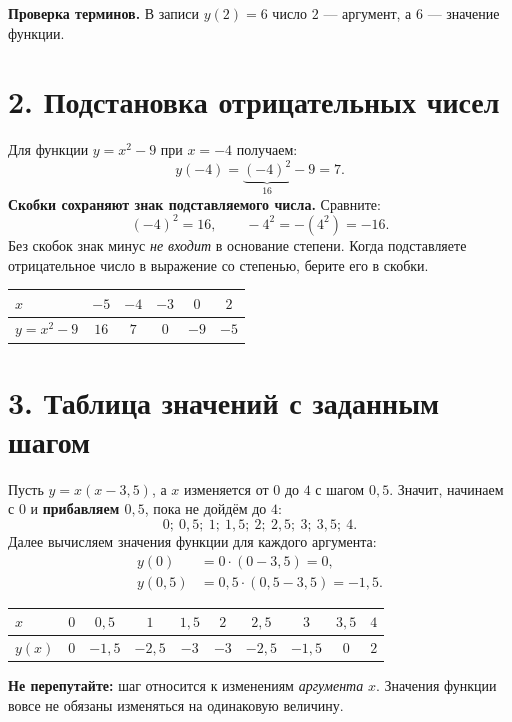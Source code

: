 \documentclass[a4paper,12pt]{article}
\newcommand{\key}[1]{\textbf{\color{darkaccent}#1}}
\newcommand{\sectionrule}{\vspace{-0.55em}{\color{accent}\hrule height .6pt}\vspace{0.5em}}
\begin{document}
\key{Проверка терминов.} В записи $y(2)=6$ число $2$ --- аргумент, а $6$ --- значение функции.

\section*{2. Подстановка отрицательных чисел}
\sectionrule
Для функции $y=x^2-9$ при $x=-4$ получаем:
\[
y(-4)=\underbrace{(-4)^2}_{16}-9=7.
\]
\key{Скобки сохраняют знак подставляемого числа.} Сравните:
\[
(-4)^2=16,\qquad -4^2=-(4^2)=-16.
\]
Без скобок знак минус \emph{не входит} в основание степени. Когда подставляете отрицательное число в выражение со степенью, берите его в скобки.

\begin{center}
\renewcommand{\arraystretch}{1.3}
\begin{tabularx}{.84\linewidth}{@{}l*{5}{C}@{}}
\toprule
$x$ & $-5$ & $-4$ & $-3$ & $0$ & $2$\\
\midrule
$y=x^2-9$ & $16$ & $7$ & $0$ & $-9$ & $-5$\\
\bottomrule
\end{tabularx}
\end{center}

\section*{3. Таблица значений с заданным шагом}
\sectionrule
Пусть $y=x(x-3{,}5)$, а $x$ изменяется от $0$ до $4$ с шагом $0{,}5$. Значит, начинаем с $0$ и \key{прибавляем $0{,}5$}, пока не дойдём до $4$:
\[
0;\ 0{,}5;\ 1;\ 1{,}5;\ 2;\ 2{,}5;\ 3;\ 3{,}5;\ 4.
\]
Далее вычисляем значения функции для каждого аргумента:
\[
\begin{aligned}
y(0)&=0\cdot(0-3{,}5)=0,\\
y(0{,}5)&=0{,}5\cdot(0{,}5-3{,}5)=-1{,}5.
\end{aligned}
\]
\begin{center}
\renewcommand{\arraystretch}{1.25}
\small
\begin{tabularx}{\linewidth}{@{}l*{9}{C}@{}}
\toprule
$x$ & $0$ & $0{,}5$ & $1$ & $1{,}5$ & $2$ & $2{,}5$ & $3$ & $3{,}5$ & $4$\\
\midrule
$y(x)$ & $0$ & $-1{,}5$ & $-2{,}5$ & $-3$ & $-3$ & $-2{,}5$ & $-1{,}5$ & $0$ & $2$\\
\bottomrule
\end{tabularx}
\end{center}
\key{Не перепутайте:} шаг относится к изменениям \emph{аргумента} $x$. Значения функции вовсе не обязаны изменяться на одинаковую величину.
\end{document}
